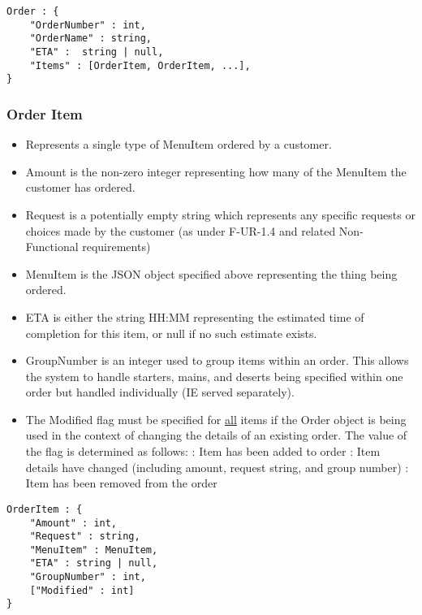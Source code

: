 \documentclass[12pt, a4paper]{article}
\begin{document}
\begin{verbatim}
Order : {
	"OrderNumber" : int,
	"OrderName" : string,
	"ETA" :  string | null,
	"Items" : [OrderItem, OrderItem, ...],
}
\end{verbatim}
\pagebreak
\subsubsection{Order Item}\label{subsubsec:OrderItem}

\begin{itemize}
\item Represents a single type of MenuItem ordered by a customer.
\item Amount is the non-zero integer representing how many of the MenuItem the customer has ordered.
\item Request is a potentially empty string which represents any specific requests or choices made by the customer (as under F-UR-1.4 and related Non-Functional requirements)
\item MenuItem is the JSON object specified above representing the thing being ordered.
\item ETA is either the string HH:MM representing the estimated time of completion for this item, or null if no such estimate exists.
\item GroupNumber is an integer used to group items within an order. This allows the system to handle starters, mains, and deserts being specified within one order but handled individually (IE served separately).
\item The Modified flag must be specified for \underline{all} items if the Order object is being used in the context of changing the details of an existing order. The value of the flag is determined as follows:
 : Item has been added to order
 : Item details have changed (including amount, request string, and group number)
 : Item has been removed from the order
\end{itemize}

\begin{verbatim}
OrderItem : {
	"Amount" : int,
	"Request" : string,
	"MenuItem" : MenuItem,
	"ETA" : string | null,
	"GroupNumber" : int,
	["Modified" : int]
}
\end{verbatim}
\end{document}
